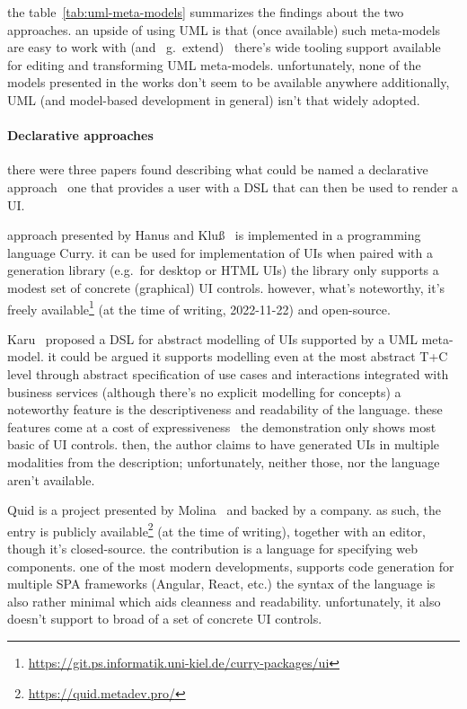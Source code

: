 the table~\ref{tab:uml-meta-models} summarizes the findings about the two approaches.
an upside of using UML is that (once available) such meta-models are easy to work with (and \textemdash\ g.~extend) \textemdash\ there's wide tooling support available for editing and transforming UML meta-models.
unfortunately, none of the models presented in the works don't seem to be available anywhere
additionally, UML (and model-based development in general) isn't that widely adopted.

\paragraph{Declarative approaches}

there were three papers found describing what could be named a declarative approach \textemdash\ one that provides a user with a DSL that can then be used to render a UI.

approach presented by Hanus and Kluß~\cite{Hanus2008-hm} is implemented in a programming language Curry.
it can be used for implementation of UIs when paired with a generation library (e.g.\ for desktop or HTML UIs)
the library only supports a modest set of concrete (graphical) UI controls.
however, what's noteworthy, it's freely available\footnote{\url{https://git.ps.informatik.uni-kiel.de/curry-packages/ui}} (at the time of writing, 2022-11-22) and open-source.

Karu~\cite{Karu2013-po} proposed a DSL for abstract modelling of UIs supported by a UML meta-model.
it could be argued it supports modelling even at the most abstract T+C level through abstract specification of use cases and interactions integrated with business services (although there's no explicit modelling for concepts)
a noteworthy feature is the descriptiveness and readability of the language.
these features come at a cost of expressiveness \textemdash\ the demonstration only shows most basic of UI controls.
then, the author claims to have generated UIs in multiple modalities from the description;
unfortunately, neither those, nor the language aren't available.

Quid is a project presented by Molina~\cite{molina2019quid} and backed by a company.
as such, the entry is publicly available\footnote{\url{https://quid.metadev.pro/}} (at the time of writing), together with an editor, though it's closed-source.
the contribution is a language for specifying web components.
one of the most modern developments, supports code generation for multiple SPA frameworks (Angular, React, etc.)
the syntax of the language is also rather minimal which aids cleanness and readability.
unfortunately, it also doesn't support to broad of a set of concrete UI controls.


